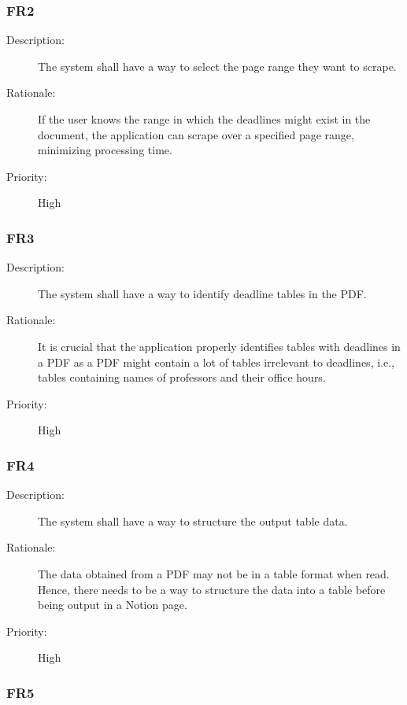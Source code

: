 \documentclass[12pt, titlepage]{article}
\begin{document}
\subsubsection{FR2}

\begin{description}
  \item[Description:] The system shall have a way to select the page range they want to scrape. 
  \item[Rationale:] If the user knows the range in which the deadlines might exist in the document, the application can scrape over a specified page range, minimizing processing time. 
  \item[Priority:] High
\end{description}

\subsubsection{FR3}

\begin{description}
  \item[Description:] The system shall have a way to identify deadline tables in the PDF.
  \item[Rationale:] It is crucial that the application properly identifies tables with deadlines in a PDF as a PDF might contain a lot of tables irrelevant to deadlines, i.e., tables containing names of professors and their office hours. 
  \item[Priority:] High
\end{description}

\subsubsection{FR4}

\begin{description}
  \item[Description:] The system shall have a way to structure the output table data. 
  \item[Rationale:] The data obtained from a PDF may not be in a table format when read. Hence, there needs to be a way to structure the data into a table before being output in a Notion page. 
  \item[Priority:] High
\end{description}

\subsubsection{FR5}
\end{document}
